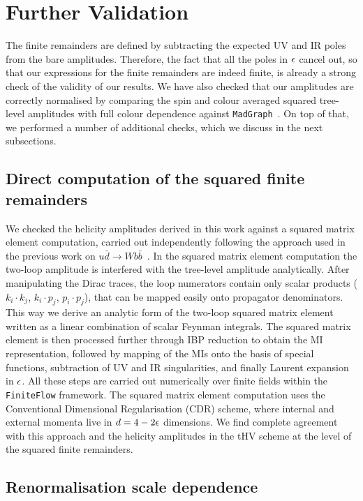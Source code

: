 \documentclass[main.tex]{subfiles}
\begin{document}
\section{Further Validation}
\label{Hbbsec:validation}

The finite remainders are defined by subtracting the expected UV and IR poles from the bare amplitudes. Therefore, the fact that all the poles in $\epsilon$ cancel out, so that our expressions for the finite remainders are indeed finite, is already a strong check of the validity of our results. We have also checked that our amplitudes are correctly normalised by comparing the spin and colour averaged squared tree-level amplitudes with full colour dependence against \texttt{MadGraph}~\cite{Alwall:2014hca}.
On top of that, we performed a number of additional checks, which we discuss in the next subsections.


\subsection{Direct computation of the squared finite remainders} 

We checked the helicity amplitudes derived in this work against a squared matrix element computation, carried out independently following the approach used in the previous work on $u\bar{d}\to Wb\bar{b}$~\cite{Badger:2021nhg}.
In the squared matrix element computation the two-loop amplitude is interfered with the tree-level amplitude analytically. After manipulating the
Dirac traces, the loop numerators contain only scalar products ($k_i \cdot k_j$, $k_i \cdot p_j$, $p_i \cdot p_j$), that can be mapped easily onto propagator denominators. This way we derive an analytic form of the two-loop squared matrix element written as a linear combination of scalar Feynman integrals. The squared matrix element is then processed further through IBP reduction to obtain the MI representation, followed by mapping of the MIs onto the basis of special functions, subtraction of UV and IR singularities, and finally Laurent expansion in $\epsilon$. 
All these steps are carried out numerically over finite fields within the \texttt{FiniteFlow} framework. 
The squared matrix element computation uses the Conventional Dimensional Regularisation (CDR) scheme, where internal and external momenta live in $d=4-2 \epsilon$ dimensions. We find complete agreement with this approach and the helicity amplitudes in the tHV scheme at the level of the squared finite remainders.


\subsection{Renormalisation scale dependence} \label{Hbbsec:renormscaledep}
\end{document}
